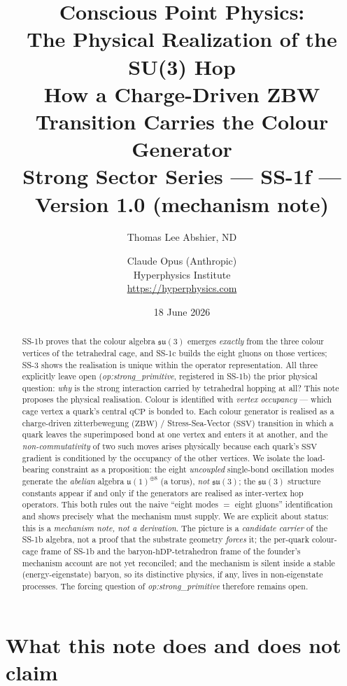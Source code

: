 \documentclass[11pt,a4paper]{article}
\title{\textbf{Conscious Point Physics:\\
The Physical Realization of the SU(3) Hop\\
{\large How a Charge-Driven ZBW Transition Carries the Colour Generator}}\\[6pt]
{\large Strong Sector Series --- SS-1f --- Version 1.0 (mechanism note)}}
\author{Thomas Lee Abshier, ND \and Claude Opus (Anthropic)\\
Hyperphysics Institute\\
\url{https://hyperphysics.com}}
\date{18 June 2026}
\newcommand{\SSV}{\mathrm{SSV}}
\newcommand{\hDP}{\mathrm{hDP}}
\newcommand{\qCP}{\mathrm{qCP}}
\newcommand{\ZBW}{\mathrm{ZBW}}
\begin{document}
\maketitle

\begin{abstract}
SS-1b proves that the colour algebra $\mathfrak{su}(3)$ emerges \emph{exactly}
from the three colour vertices of the tetrahedral cage, and SS-1c builds the
eight gluons on those vertices; SS-3 shows the realisation is unique within the
operator representation. All three explicitly leave open
(\emph{op:strong\_primitive}, registered in SS-1b) the prior physical question:
\emph{why} is the strong interaction carried by tetrahedral hopping at all?
This note proposes the physical realisation. Colour is identified with
\emph{vertex occupancy} --- which cage vertex a quark's central $\qCP$ is bonded
to. Each colour generator is realised as a charge-driven
zitterbewegung ($\ZBW$) / Stress-Sea-Vector ($\SSV$) transition in which a quark
leaves the superimposed bond at one vertex and enters it at another, and the
\emph{non-commutativity} of two such moves arises physically because each quark's
$\SSV$ gradient is conditioned by the occupancy of the other vertices.
We isolate the load-bearing constraint as a proposition: the eight
\emph{uncoupled} single-bond oscillation modes generate the \emph{abelian}
algebra $\mathfrak{u}(1)^{\oplus 8}$ (a torus), \emph{not} $\mathfrak{su}(3)$;
the $\mathfrak{su}(3)$ structure constants appear if and only if the generators
are realised as inter-vertex hop operators. This both rules out the naive
``eight modes $=$ eight gluons'' identification and shows precisely what the
mechanism must supply. We are explicit about status: this is a \emph{mechanism
note, not a derivation}. The picture is a \emph{candidate carrier} of the
SS-1b algebra, not a proof that the substrate geometry \emph{forces} it; the
per-quark colour-cage frame of SS-1b and the baryon-$\hDP$-tetrahedron frame
of the founder's mechanism account are not yet reconciled; and the mechanism
is silent inside a stable (energy-eigenstate) baryon, so its distinctive
physics, if any, lives in non-eigenstate processes. The forcing question of
\emph{op:strong\_primitive} therefore remains open.
\end{abstract}

\section{What this note does and does not claim}
\label{sec:honesty}
\end{document}
